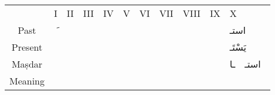 \documentclass{article}
\newcommand\lb{~}
\newcommand\lbi{ِ}
\newcommand\lbsu{ْ}
\begin{document}
\begin{tabular}{ccccccccccl}
&I&II&III&IV&V&VI&VII&VIII&IX&X\\

    Past    &  َ &  &  &  &  &  &  &  && استـ\lb{}\lb{}\lb{}\\
    Present &  &  &  &  &  &  &  &  && يَسْتَـ\lb{}\lbsu\lb{}\lbi\lb{}\\
    Maṣdar  &  &  &  &  &  &  &  &  &&استـ\lb\lb{}ـا\lb \\
    Meaning &  &  &  &  &  &  &  &  && \\

\end{tabular}
\end{document}
